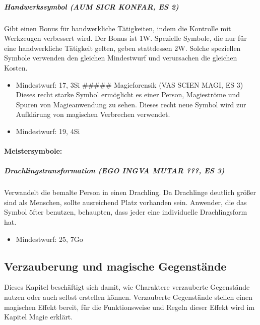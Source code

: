 \documentclass{article}
\begin{document}
\subparagraph{Handwerkssymbol (AUM SICR KONFAR, ES 2)}
Gibt einen Bonus für handwerkliche Tätigkeiten, indem die Kontrolle mit Werkzeugen verbessert wird. Der Bonus ist 1W. Spezielle Symbole, die nur für eine handwerkliche Tätigkeit gelten, geben stattdessen 2W. Solche speziellen Symbole verwenden den gleichen Mindestwurf und verursachen die gleichen Kosten.
\begin{itemize}
\item Mindestwurf: 17, 3Si \#\#\#\#\# Magieforensik (VAS SCIEN MAGI, ES 3) Dieses recht starke Symbol ermöglicht es einer Person, Magieströme und Spuren von Magieanwendung zu sehen. Dieses recht neue Symbol wird zur Aufklärung von magischen Verbrechen verwendet.
\item Mindestwurf: 19, 4Si
\end{itemize}

\paragraph{Meistersymbole:}

\subparagraph{Drachlingstransformation (EGO INGVA MUTAR ???, ES 3)}
Verwandelt die bemalte Person in einen Drachling. Da Drachlinge deutlich größer sind als Menschen, sollte ausreichend Platz vorhanden sein. Anwender, die das Symbol öfter benutzen, behaupten, dass jeder eine individuelle Drachlingsform hat.
\begin{itemize}
\item Mindestwurf: 25, 7Go
\end{itemize}

\begin{center}
\section{Verzauberung und magische Gegenstände}
\end{center}

Dieses Kapitel beschäftigt sich damit, wie Charaktere verzauberte Gegenstände nutzen oder auch selbst erstellen können.
Verzauberte Gegenstände stellen einen magischen Effekt bereit, für die Funktionsweise und Regeln dieser Effekt wird im
Kapitel Magie erklärt.
\end{document}
